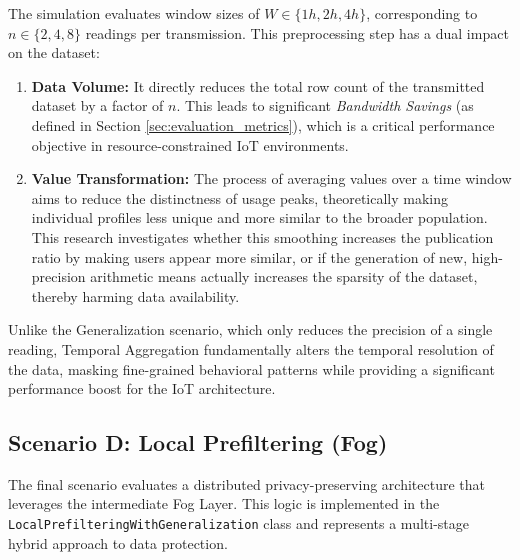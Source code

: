 The simulation evaluates window sizes of $W \in \{1h, 2h, 4h\}$, corresponding to $n \in \{2, 4, 8\}$ readings per transmission. This preprocessing step has a dual impact on the dataset:
\begin{enumerate}
    \item \textbf{Data Volume:} It directly reduces the total row count of the transmitted dataset by a factor of $n$. This leads to significant \textit{Bandwidth Savings} (as defined in Section \ref{sec:evaluation_metrics}), which is a critical performance objective in resource-constrained \ac{IoT} environments.
    \item \textbf{Value Transformation:} The process of averaging values over a time window aims to reduce the distinctness of usage peaks, theoretically making individual profiles less unique and more similar to the broader population. This research investigates whether this smoothing increases the publication ratio by making users appear more similar, or if the generation of new, high-precision arithmetic means actually increases the sparsity of the dataset, thereby harming data availability.

\end{enumerate}

Unlike the Generalization scenario, which only reduces the precision of a single reading, Temporal Aggregation fundamentally alters the temporal resolution of the data, masking fine-grained behavioral patterns while providing a significant performance boost for the \ac{IoT} architecture.



\subsection{Scenario D: Local Prefiltering (Fog)}
The final scenario evaluates a distributed privacy-preserving architecture that leverages the intermediate Fog Layer. This logic is implemented in the \texttt{LocalPrefilteringWithGeneralization} class and represents a multi-stage hybrid approach to data protection.






